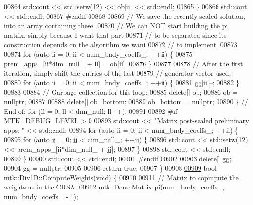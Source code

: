 \begin{DoxyCode}
{{00864       std::cout << std::setw(12) << ob[ii] << std::endl;
00865     \}
00866     std::cout << std::endl;
00867 \textcolor{preprocessor}{    #endif}
00868 
00869     \textcolor{comment}{// We save the recently scaled solution, into an array containing these.}
00870     \textcolor{comment}{// We can NOT start building the pi matrix, simply because I want that part}
00871     \textcolor{comment}{// to be separated since its construction depends on the algorithm we want}
00872     \textcolor{comment}{// to implement.}
00873 
00874     \textcolor{keywordflow}{for} (\textcolor{keyword}{auto} ii = 0; ii < num\_bndy\_coeffs\_; ++ii) \{
00875       prem\_apps\_[ii*dim\_null\_ + ll] = ob[ii];
00876     \}
00877 
00878     \textcolor{comment}{// After the first iteration, simply shift the entries of the last}
00879     \textcolor{comment}{// generator vector used:}
00880     \textcolor{keywordflow}{for} (\textcolor{keyword}{auto} ii = 0; ii < num\_bndy\_coeffs\_; ++ii) \{
00881       gg[ii]--;
00882     \}
00883 
00884     \textcolor{comment}{// Garbage collection for this loop:}
00885     \textcolor{keyword}{delete}[] ob;
00886     ob = \textcolor{keyword}{nullptr};
00887 
00888     \textcolor{keyword}{delete}[] ob\_bottom;
00889     ob\_bottom = \textcolor{keyword}{nullptr};
00890   \} \textcolor{comment}{// End of: for (ll = 0; ll < dim\_null; ll++);}
00891 
00892 \textcolor{preprocessor}{  #if MTK\_DEBUG\_LEVEL > 0}
00893   std::cout << \textcolor{stringliteral}{"Matrix post-scaled preliminary apps: "} << std::endl;
00894   \textcolor{keywordflow}{for} (\textcolor{keyword}{auto} ii = 0; ii < num\_bndy\_coeffs\_; ++ii) \{
00895     \textcolor{keywordflow}{for} (\textcolor{keyword}{auto} jj = 0; jj < dim\_null\_; ++jj) \{
00896       std::cout << std::setw(12) << prem\_apps\_[ii*dim\_null\_ + jj];
00897     \}
00898     std::cout << std::endl;
00899   \}
00900   std::cout << std::endl;
00901 \textcolor{preprocessor}{  #endif}
00902 
00903   \textcolor{keyword}{delete}[] gg;
00904   gg = \textcolor{keyword}{nullptr};
00905 
00906   \textcolor{keywordflow}{return} \textcolor{keyword}{true};
00907 \}
00908 
\hypertarget{mtk__div__1d_8cc_source_l00909}{}\hyperlink{classmtk_1_1Div1D_aaadd6a6e6836bb94841c4c35dffab828}{00909} \textcolor{keywordtype}{bool} \hyperlink{classmtk_1_1Div1D_aaadd6a6e6836bb94841c4c35dffab828}{mtk::Div1D::ComputeWeights}(\textcolor{keywordtype}{void}) \{
00910 
00911   \textcolor{comment}{// Matrix to copmpute the weights as in the CRSA.}
00912   \hyperlink{classmtk_1_1DenseMatrix}{mtk::DenseMatrix} pi(num\_bndy\_coeffs\_, num\_bndy\_coeffs\_ - 1);
}}
\end{DoxyCode}
